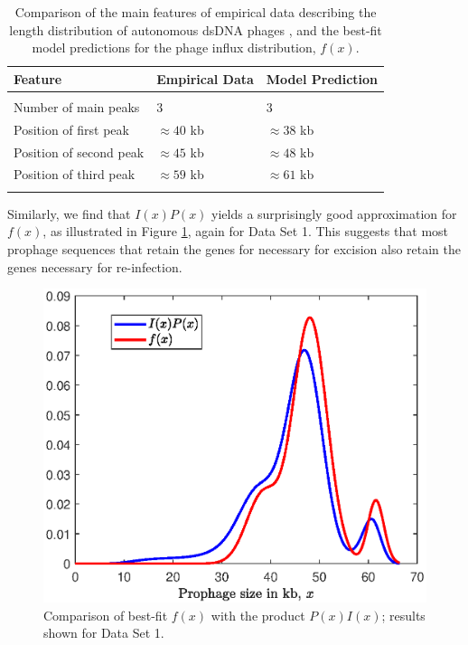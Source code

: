 \renewcommand{\baselinestretch}{1}
\begin{table}[hbt!]
\centering
\begin{tabular}{ p{6cm}p{2cm}p{3cm} }
\hline
Feature & Empirical Data & Model Prediction  \\
\hline
\\
 Number of main peaks&     3&          3\\
  Position of first peak&        $\approx 40$ kb&          $\approx38$ kb\\
 Position of second peak &    $\approx 45$ kb &          $\approx 48$ kb\\

 Position of third peak&       $\approx 59$ kb&      $\approx 61$ kb\\
 \\
 \hline
\end{tabular}
\caption[Comparison of the main features of empirical data describing the length distribution of autonomous dsDNA phages.]{Comparison of the main features of empirical data describing the length distribution of autonomous dsDNA phages \citep{bobay_pervasive_2014}, and the best-fit model predictions for the phage influx distribution, $f(x)$. }
\label{table:sens_f}
\end{table}
Similarly, we find that $I(x)P(x)$ yields a surprisingly good approximation for $f(x)$, as illustrated in Figure \ref{fig:IP}, again for Data Set 1.  This suggests that most prophage sequences that retain the genes for necessary for excision also retain the genes necessary for re-infection.

\begin{figure}[t]\centering
\includegraphics[scale=0.7]{IP.eps}
\caption[Comparison of best-fit $f(x)$ with the product $P(x)I(x)$.]{Comparison of best-fit $f(x)$ with the product $P(x)I(x)$; results shown for Data Set 1.}
\label{fig:IP}
\end{figure}

